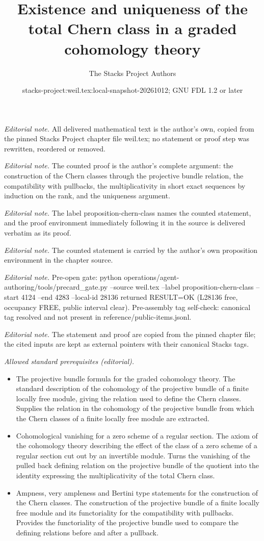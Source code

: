 \documentclass[10pt,a4paper]{amsart}
\title{Existence and uniqueness of the total Chern class in a graded cohomology theory}
\author{The Stacks Project Authors}
\date{stacks-project:weil.tex:local-snapshot-20261012; GNU FDL 1.2 or later}
\theoremstyle{plain}
\theoremstyle{definition}
\theoremstyle{remark}
\numberwithin{equation}{subsection}
\begin{document}
\maketitle
\noindent\textit{Editorial note.} All delivered mathematical text is the author's own, copied from the pinned Stacks Project chapter file weil.tex; no statement or proof step was rewritten, reordered or removed.\par\medskip
\noindent\textit{Editorial note.} The counted proof is the author's complete argument: the construction of the Chern classes through the projective bundle relation, the compatibility with pullbacks, the multiplicativity in short exact sequences by induction on the rank, and the uniqueness argument.\par\medskip
\noindent\textit{Editorial note.} The label proposition-chern-class names the counted statement, and the proof environment immediately following it in the source is delivered verbatim as its proof.\par\medskip
\noindent\textit{Editorial note.} The counted statement is carried by the author's own proposition environment in the chapter source.\par\medskip
\noindent\textit{Editorial note.} Pre-open gate: python operations/agent-authoring/tools/precard\_gate.py --source weil.tex --label proposition-chern-class --start 4124 --end 4283 --local-id 28136 returned RESULT=OK (L28136 free, occupancy FREE, public interval clear). Pre-assembly tag self-check: canonical tag resolved and not present in reference/public-items.jsonl.\par\medskip
\noindent\textit{Editorial note.} The statement and proof are copied from the pinned chapter file; the cited inputs are kept as external pointers with their canonical Stacks tags.\par\medskip
\noindent\textit{Allowed standard prerequisites (editorial).}\begin{itemize}
\item The projective bundle formula for the graded cohomology theory. The standard description of the cohomology of the projective bundle of a finite locally free module, giving the relation used to define the Chern classes. Supplies the relation in the cohomology of the projective bundle from which the Chern classes of a finite locally free module are extracted.
\item Cohomological vanishing for a zero scheme of a regular section. The axiom of the cohomology theory describing the effect of the class of a zero scheme of a regular section cut out by an invertible module. Turns the vanishing of the pulled back defining relation on the projective bundle of the quotient into the identity expressing the multiplicativity of the total Chern class.
\item Ampness, very ampleness and Bertini type statements for the construction of the Chern classes. The construction of the projective bundle of a finite locally free module and its functoriality for the compatibility with pullbacks. Provides the functoriality of the projective bundle used to compare the defining relations before and after a pullback.
\end{itemize}\medskip
\end{document}
